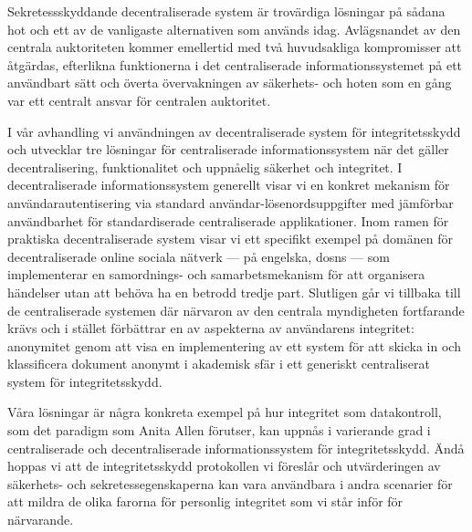     Sekretessskyddande decentraliserade system är trovärdiga lösningar på sådana 
    hot och ett av de vanligaste alternativen som används idag. Avlägsnandet av 
    den centrala auktoriteten kommer emellertid med två huvudsakliga kompromisser 
    att åtgärdas, efterlikna funktionerna i det centraliserade informationssystemet 
    på ett användbart sätt och överta övervakningen av säkerhets- och hoten som 
    en gång var ett centralt ansvar för centralen auktoritet.
    
    I vår avhandling vi användningen av decentraliserade system för integritetsskydd 
    och utvecklar tre lösningar för centraliserade informationssystem när det gäller 
    decentralisering, funktionalitet och uppnåelig säkerhet och integritet. I decentraliserade 
    informationssystem generellt visar vi en konkret mekanism för användarautentisering 
    via standard användar-lösenordsuppgifter med jämförbar användbarhet för standardiserade 
    centraliserade applikationer. Inom ramen för praktiska decentraliserade system 
    visar vi ett specifikt exempel på domänen för decentraliserade online sociala 
    nätverk --- på engelska, \aclp*{dosn} --- som implementerar en samordnings- 
    och samarbetsmekanism för att organisera händelser utan att behöva ha en betrodd 
    tredje part. Slutligen går vi tillbaka till de centraliserade systemen där närvaron 
    av den centrala myndigheten fortfarande krävs och i stället förbättrar en av 
    aspekterna av användarens integritet: anonymitet genom att visa en implementering 
    av ett system för att skicka in och klassificera dokument anonymt i akademisk 
    sfär i ett generiskt centraliserat system för integritetsskydd.
    
    Våra lösningar är några konkreta exempel på hur integritet som datakontroll, 
    som det paradigm som Anita Allen förutser, kan uppnås i varierande grad i centraliserade 
    och decentraliserade informationssystem för integritetsskydd. Ändå hoppas vi 
    att de integritetsskydd protokollen vi föreslår och utvärderingen av säkerhets- 
    och sekretessegenskaperna kan vara användbara i andra scenarier för att mildra 
    de olika farorna för personlig integritet som vi står inför för närvarande.
